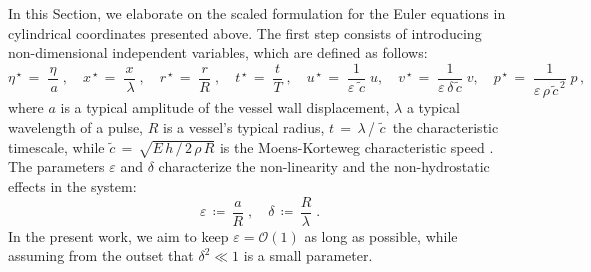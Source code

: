 \documentclass[alpha-refs, 12pt]{wiley-article}
\renewcommand{\O}{\mathcal{O}}
\newcommand{\eps}{\varepsilon}
\begin{document}
In this Section, we elaborate on the scaled formulation for the Euler equations in cylindrical coordinates presented above. The first step consists of introducing non-dimensional independent variables, which are defined as follows:
\begin{equation*}
  \eta^{\,\star}\,=\;\frac{\eta}{\,a}\;,\quad x^{\,\star}\,=\;\frac{x}{\,\lambda}\;,\quad r^{\,\star}\,=\;\frac{r}{R}\;,\quad t^{\,\star}\,=\;\frac{t}{T}\;,\quad u^{\,\star}\,=\;\frac{1}{\eps\, \tilde{\,c}}\;u, \quad v^{\,\star}\,=\;\frac{1}{\eps\,\delta\,\tilde{c}}\;v, \quad p^{\,\star}\,=\;\frac{1}{\eps\,\rho\, \tilde{c}^{\,2}}\;p\,,
\end{equation*}
where $a$ is a typical amplitude of the vessel wall displacement, $\lambda$ a typical wavelength of a pulse, $R$ is a vessel's typical radius, $ t\,=\,\lambda$\,/\,\,$\tilde{c}\,$ the characteristic timescale, while $\tilde{c}\,=\,\sqrt{E\,h\,/\,2\, \rho\,R}$ is the Moens-Korteweg characteristic speed \citep{Fung1997a}. The parameters $\eps$ and $\delta$ characterize the non-linearity and the non-hydrostatic effects in the system:
\begin{equation*}
  \eps\,\coloneqq\, \frac{a}{R}\;, \quad \delta\,\coloneqq\,\frac{R}{\lambda}\;.
\end{equation*}
In the present work, we aim to keep $\eps = \O(1)$ as long as possible, while assuming from the outset that $\delta^2 \ll 1$ is a small parameter.
\end{document}

